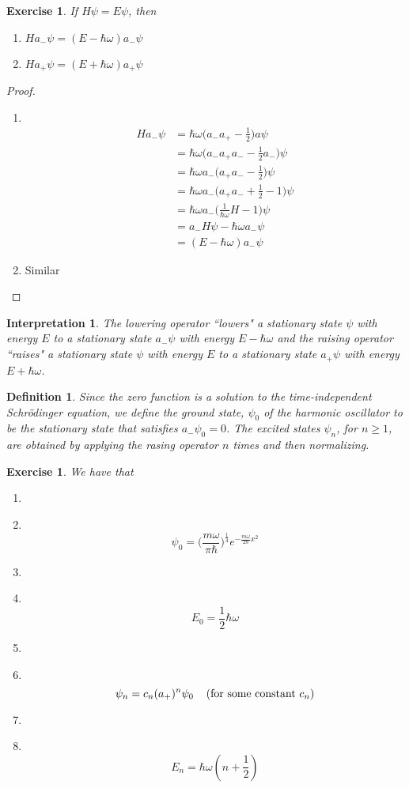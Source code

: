 \documentclass[12pt]{amsart}
\newtheorem{defn}[thm]{Definition}
\newtheorem{intp}[thm]{Interpretation}
\newtheorem{ex}[thm]{Exercise}
\newcommand{\sch}{Schr\"{o}dinger }
\newcommand\Item[1][]{%
  \ifx\relax#1\relax  \item \else \item[#1] \fi
  \abovedisplayskip=0pt\abovedisplayshortskip=0pt~\vspace*{-\baselineskip}}
\newcommand{\om}{\omega}
\begin{document}
\begin{ex}
If $H\psi = E\psi$, then 
\begin{enumerate}
\item $Ha_-\psi = (E-\hbar \om) a_- \psi$
\item $Ha_+\psi = (E+\hbar \om) a_+ \psi$
\end{enumerate}
\end{ex}

\begin{proof}\
\begin{enumerate}
\item \
\begin{align*}
Ha_-\psi 
&= \hbar \om \bigg(a_-a_+-\frac{1}{2}\bigg)a \psi\\
&= \hbar \om \bigg(a_-a_+a_- -\frac{1}{2}a_-\bigg) \psi\\
&= \hbar \om a_-\bigg(a_+a_- -\frac{1}{2}\bigg) \psi\\
&= \hbar \om a_-\bigg(a_+a_- +\frac{1}{2} -1\bigg) \psi\\
&= \hbar \om a_-\bigg(\frac{1}{\hbar \om}H -1\bigg) \psi\\
&= a_- H\psi -\hbar \om a_- \psi \\
&= (E - \hbar \om)a_-\psi 
\end{align*}
\item Similar
\end{enumerate}
\end{proof}

\begin{intp}
The lowering operator ``lowers"  a stationary state $\psi$ with energy $E$ to a stationary state $a_-\psi$ with energy $E-\hbar \om$ and the raising operator ``raises"  a stationary state $\psi$ with energy $E$ to a stationary state $a_+\psi$ with energy $E+\hbar \om$.
\end{intp}

\begin{defn}
Since the zero function is a solution to the time-independent \sch equation, we define the ground state, $\psi_0$ of the harmonic oscillator to be the stationary state that satisfies $a_-\psi_0 = 0$. The excited states $\psi_n$, for $n \geq 1$, are obtained by applying the rasing operator $n$ times and then normalizing.
\end{defn}

\begin{ex}
We have that
\begin{enumerate}
\Item $$\psi_0= \bigg(\frac{m \om}{ \pi \hbar}\bigg)^{\frac{1}{4}}e^{-\frac{m \om}{2 \hbar}x^2}$$\vspace{2mm}
\Item $$E_0 = \frac{1}{2}\hbar \om$$ \vspace{2mm}
\Item $$\psi_n = c_n(a_+)^n\psi_0 \hspace{.4cm} (\text{for some constant } c_n)$$ \vspace{2mm}
\Item $$E_n = \hbar \om (n + \frac{1}{2})$$
\end{enumerate}

\end{ex}
\end{document}
